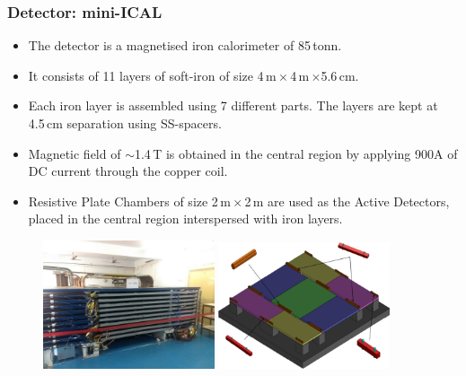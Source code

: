 \documentclass{beamer}
\begin{document}
\begin{frame}
  \frametitle{Detector: mini-ICAL}
  \begin{itemize} \itemsep -1pt
  \item The detector is a magnetised iron calorimeter of 85\,tonn.
  \item It consists of 11 layers of soft-iron of size
    4\,m\,$\times$\,4\,m\,$\times$5.6\,cm.
  \item Each iron layer is assembled using 7 different parts.
    The layers are kept at 4.5\,cm separation using SS-spacers.
  \item Magnetic field of $\sim$1.4\,T is obtained in the central
    region by applying 900A of DC current through the copper coil.
  \item Resistive Plate Chambers of size 2\,m\,$\times$\,2\,m are
    used as the Active Detectors, placed in the central region
    interspersed with iron layers.
  \end{itemize}
  \vspace*{-5pt}
  \begin{figure}[h!]
    \includegraphics[width=0.45\textwidth]{micalphoto.png}
    \includegraphics[width=0.45\textwidth]{miniICAL_iron_block.pdf}
  \end{figure}
\end{frame}
\end{document}
